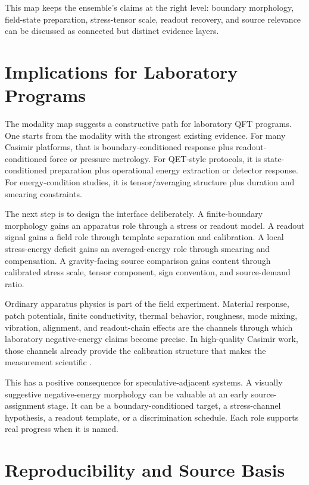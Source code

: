 \documentclass[11pt]{article}
\begin{document}
This map keeps the ensemble's claims at the right level: boundary morphology,
field-state preparation, stress-tensor scale, readout recovery, and source
relevance can be discussed as connected but distinct evidence layers.

\section{Implications for Laboratory Programs}

The modality map suggests a constructive path for laboratory QFT programs.
One starts from the modality with the strongest existing evidence. For many
Casimir platforms, that is boundary-conditioned response plus
readout-conditioned force or pressure metrology. For QET-style protocols, it
is state-conditioned preparation plus operational energy extraction or detector
response. For energy-condition studies, it is tensor/averaging structure plus
duration and smearing constraints.

The next step is to design the interface deliberately. A finite-boundary
morphology gains an apparatus role through a stress or readout model. A
readout signal gains a field role through template separation and calibration.
A local stress-energy deficit gains an averaged-energy role through smearing
and compensation. A gravity-facing source comparison gains content through
calibrated stress scale, tensor component, sign convention, and source-demand
ratio.

Ordinary apparatus physics is part of the field experiment.
Material response, patch potentials, finite conductivity, thermal behavior,
roughness, mode mixing, vibration, alignment, and readout-chain effects are
the channels through which laboratory negative-energy claims become precise.
In high-quality Casimir work, those
channels already provide the calibration structure that makes the measurement
scientific \cite{Bimonte2021,Behunin2011,Garrett2015,Xu2026}.

This has a positive consequence for speculative-adjacent systems. A visually
suggestive negative-energy morphology can be valuable at an early
source-assignment stage. It can be a boundary-conditioned target, a
stress-channel hypothesis, a readout template, or a discrimination schedule.
Each role supports real progress when it is named.

\section{Reproducibility and Source Basis}
\end{document}
